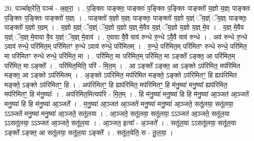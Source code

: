 \documentclass[17pt]{extarticle}
\begin{document}
20. पञ्चा᳚क्ष॒रेति॒ पञ्च॑ - अ॒क्ष॒रा॒ । . प॒ङ्क्तिः पाङ्क्तः॒ पाङ्क्तः॑ प॒ङ्क्तिः प॒ङ्क्तिः पाङ्क्तो॑ य॒ज्ञो य॒ज्ञ्ः पाङ्क्तः॑ प॒ङ्क्तिः प॒ङ्क्तिः पाङ्क्तो॑ य॒ज्ञ्ः । . पाङ्क्तो॑ य॒ज्ञो य॒ज्ञ्ः पाङ्क्तः॒ पाङ्क्तो॑ य॒ज्ञो य॒ज्ञ्ं ॅय॒ज्ञ्ं ॅय॒ज्ञ्ः पाङ्क्तः॒ पाङ्क्तो॑ य॒ज्ञो य॒ज्ञ्म् । . य॒ज्ञो य॒ज्ञ्ं ॅय॒ज्ञ्ं ॅय॒ज्ञो य॒ज्ञो य॒ज्ञ् मे॒वैव य॒ज्ञ्ं ॅय॒ज्ञो य॒ज्ञो य॒ज्ञ् मे॒व । . य॒ज्ञ् मे॒वैव य॒ज्ञ्ं ॅय॒ज्ञ् मे॒वावा वै॒व य॒ज्ञ्ं ॅय॒ज्ञ् मे॒वाव॑ । . ए॒वावा वै॒वै वाव॑ रुन्धे रु॒न्धे ऽवै॒वै वाव॑ रुन्धे । . अव॑ रुन्धे रु॒न्धे ऽवाव॑ रुन्धे॒ परि॑मित॒म् परि॑मितꣳ रु॒न्धे ऽवाव॑ रुन्धे॒ परि॑मितम् । . रु॒न्धे॒ परि॑मित॒म् परि॑मितꣳ रुन्धे रुन्धे॒ परि॑मित॒ मा परि॑मितꣳ रुन्धे रुन्धे॒ परि॑मित॒ मा । . परि॑मित॒ मा परि॑मित॒म् परि॑मित॒ मा ऽङ्क्ते᳚ ऽङ्क्त॒ आ परि॑मित॒म् परि॑मित॒ मा ऽङ्क्ते᳚ । . परि॑मित॒मिति॒ परि॑ - मि॒त॒म् । . आ ऽङ्क्ते᳚ ऽङ्क्त॒ आ ऽङ्क्ते ऽप॑रिमित॒ मप॑रिमित मङ्क्त॒ आ ऽङ्क्ते ऽप॑रिमितम् । . अ॒ङ्क्ते ऽप॑रिमित॒ मप॑रिमित मङ्क्ते॒ ऽङ्क्ते ऽप॑रिमितꣳ॒॒ हि ह्यप॑रिमित मङ्क्ते॒ ऽङ्क्ते ऽप॑रिमितꣳ॒॒ हि । . अप॑रिमितꣳ॒॒ हि ह्यप॑रिमित॒ मप॑रिमितꣳ॒॒ हि म॑नु॒ष्या॑ मनु॒ष्या᳚ ह्यप॑रिमित॒ मप॑रिमितꣳ॒॒ हि म॑नु॒ष्याः᳚ । . अप॑रिमित॒मित्यप॑रि - मि॒त॒म् । . हि म॑नु॒ष्या॑ मनु॒ष्या॑ हि हि म॑नु॒ष्या॑ आ॒ञ्जत॑ आ॒ञ्जते॑ मनु॒ष्या॑ हि हि म॑नु॒ष्या॑ आ॒ञ्जते᳚ । . म॒नु॒ष्या॑ आ॒ञ्जत॑ आ॒ञ्जते॑ मनु॒ष्या॑ मनु॒ष्या॑ आ॒ञ्जते॒ सतू॑लया॒ सतू॑लया॒ ऽऽञ्जते॑ मनु॒ष्या॑ मनु॒ष्या॑ आ॒ञ्जते॒ सतू॑लया । . आ॒ञ्जते॒ सतू॑लया॒ सतू॑लया॒ ऽऽञ्जत॑ आ॒ञ्जते॒ सतू॑ल॒या ऽऽसतू॑लया॒ ऽऽञ्जत॑ आ॒ञ्जते॒ सतू॑ल॒या । . आ॒ञ्जत॒ इत्या᳚ - अ॒ञ्जते᳚ । . सतू॑ल॒या ऽऽसतू॑लया॒ सतू॑ल॒या ऽङ्क्ते᳚ ऽङ्क्त॒ आ सतू॑लया॒ सतू॑ल॒या ऽङ्क्ते᳚ । . सतू॑ल॒येति॒ स - तू॒ल॒या॒ । \newline
\end{document}
